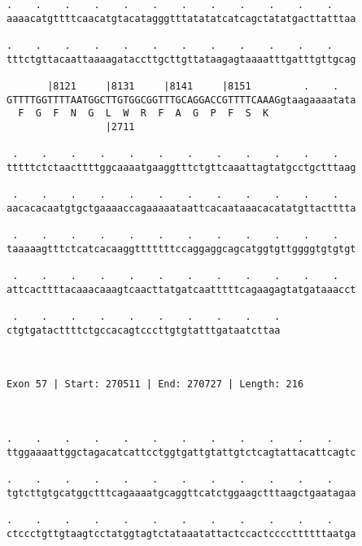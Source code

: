 \documentclass{article}
\begin{document}
\begin{Verbatim}
.    .    .    .    .    .    .    .    .    .    .    .    
aaaacatgttttcaacatgtacatagggtttatatatcatcagctatatgacttatttaa
                                                            
.    .    .    .    .    .    .    .    .    .    .    .    
tttctgttacaattaaaagataccttgcttgttataagagtaaaatttgatttgttgcag
                                                            
       |8121     |8131     |8141     |8151         .    .   
GTTTTGGTTTTAATGGCTTGTGGCGGTTTGCAGGACCGTTTTCAAAGgtaagaaaatata
  F  G  F  N  G  L  W  R  F  A  G  P  F  S  K               
                 |2711                                      
  
 .    .    .    .    .    .    .    .    .    .    .    .   
tttttctctaacttttggcaaaatgaaggtttctgttcaaattagtatgcctgctttaag
                                                            
 .    .    .    .    .    .    .    .    .    .    .    .   
aacacacaatgtgctgaaaaccagaaaaataattcacaataaacacatatgttactttta
                                                            
 .    .    .    .    .    .    .    .    .    .    .    .   
taaaaagtttctcatcacaaggtttttttccaggaggcagcatggtgttggggtgtgtgt
                                                            
 .    .    .    .    .    .    .    .    .    .    .    .   
attcacttttacaaacaaagtcaacttatgatcaatttttcagaagagtatgataaacct
                                                            
 .    .    .    .    .    .    .    .    .    .
ctgtgatacttttctgccacagtcccttgtgtatttgataatcttaa
                                               
                                               
 
Exon 57 | Start: 270511 | End: 270727 | Length: 216



.    .    .    .    .    .    .    .    .    .    .    .    
ttggaaaattggctagacatcattcctggtgattgtattgtctcagtattacattcagtc
                                                            
.    .    .    .    .    .    .    .    .    .    .    .    
tgtcttgtgcatggctttcagaaaatgcaggttcatctggaagctttaagctgaatagaa
                                                            
.    .    .    .    .    .    .    .    .    .    .    .    
ctccctgttgtaagtcctatggtagtctataaatattactccactccccttttttaatga
                                                            

\end{Verbatim}
\end{document}
